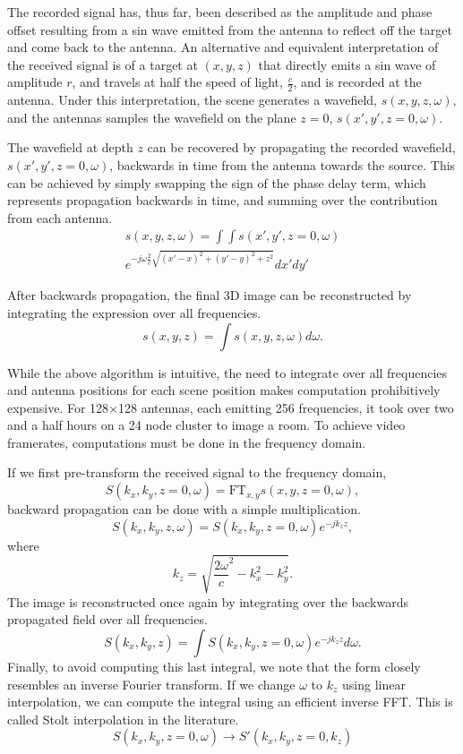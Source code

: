 \documentclass[twocolumn]{article}
\begin{document}
The recorded signal has, thus far, been described as the amplitude and phase offset resulting from a sin wave emitted from the antenna to reflect off the target and come back to the antenna. An alternative and equivalent interpretation of the received signal is of a target at $(x,y,z)$ that directly emits a sin wave of amplitude $r$, and travels at half the speed of light, $\frac{c}{2}$, and is recorded at the antenna. Under this interpretation, the scene generates a wavefield, $s(x,y,z,\omega)$, and the antennas samples the wavefield on the plane $z=0$, $s(x',y',z=0,\omega)$. 

The wavefield at depth $z$ can be recovered by propagating the recorded wavefield, $s(x',y',z=0,\omega)$, backwards in time from the antenna towards the source. This can be achieved by simply swapping the sign of the phase delay term, which represents propagation backwards in time, and summing over the contribution from each antenna.
\begin{gather}
s(x,y,z,\omega) =\int\int s(x',y',z=0,\omega) \\
e^{-j \omega \frac{2}{c} \sqrt{(x'-x)^{2}+(y'-y)^{2}+z^{2}}} dx'dy'
\end{gather}

After backwards propagation, the final 3D image can be reconstructed by integrating the expression over all frequencies.
\[
s(x,y,z)=\int s(x,y,z,\omega) d\omega.
\]

While the above algorithm is intuitive, the need to integrate over all frequencies and antenna positions for each scene position makes computation prohibitively expensive. For 128$\times$128 antennas, each emitting 256 frequencies, it took over two and a half hours on a 24 node cluster to image a room. To achieve video framerates, computations must be done in the frequency domain.

If we first pre-transform the received signal to the frequency domain, 
\[
S(k_x,k_y,z=0,\omega) = \text{FT}_{x,y} s(x, y, z=0, \omega),
\]
backward propagation can be done with a simple multiplication. 
\[
S(k_x, k_y, z, \omega) = S(k_x, k_y, z=0, \omega) e^{-j k_z z},
\]
where 
\[
k_z = \sqrt{ \frac{2 \omega}{c} ^ 2 - k_x^2 - k_y^2}.
\]
The image is reconstructed once again by integrating over the backwards propagated field over all frequencies.
\[
S(k_x, k_y, z) = \int S(k_x, k_y, z=0, \omega) e^{-j k_z z} d\omega.
\]
Finally, to avoid computing this last integral, we note that the form closely resembles an inverse Fourier transform. If we change $\omega$ to $k_z$ using linear interpolation, we can compute the integral using an efficient inverse FFT. This is called Stolt interpolation in the literature.
\[
S(k_x, k_y, z=0, \omega) \rightarrow S'(k_x, k_y, z=0, k_z)
\]
\end{document}
